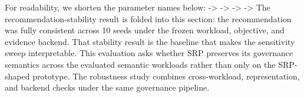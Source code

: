 {}For readability, we shorten the parameter names below:\markdownRendererInterblockSeparator
{}\markdownRendererUlBeginTight
\markdownRendererUlItem {} -> \markdownRendererUlItemEnd 
\markdownRendererUlItem {} -> \markdownRendererUlItemEnd 
\markdownRendererUlItem {} -> \markdownRendererUlItemEnd 
\markdownRendererUlItem {} -> \markdownRendererUlItemEnd 
\markdownRendererUlEndTight \markdownRendererInterblockSeparator
{}\markdownRendererInterblockSeparator
{}\markdownRendererInterblockSeparator
{}The recommendation-stability result is folded into this section: the recommendation was fully consistent across 10 seeds under the frozen workload, objective, and evidence backend. That stability result is the baseline that makes the sensitivity sweep interpretable.\markdownRendererInterblockSeparator
{}
\markdownRendererSectionEnd \markdownRendererSectionBegin
{}\markdownRendererInterblockSeparator
{}This evaluation asks whether SRP preserves its governance semantics across the evaluated semantic workloads rather than only on the SRP-shaped prototype.\markdownRendererParagraphSeparator
{}The robustness study combines cross-workload, representation, and backend checks under the same governance pipeline.\markdownRendererParagraphSeparator
{}\markdownRendererInterblockSeparator
{}\markdownRendererInterblockSeparator
{}\markdownRendererInterblockSeparator
{}\markdownRendererInterblockSeparator
{}\markdownRendererInterblockSeparator
